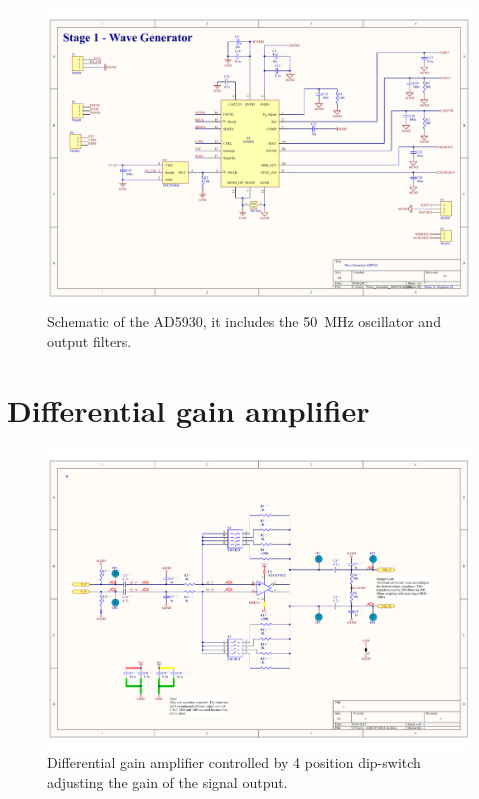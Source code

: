 \begin{landscape}
	\begin{figure}[!htpb]
		\centering
		\includegraphics[width=\paperwidth,keepaspectratio]{DDS}
		\caption[Direct digital synthesis circuit schematic]{Schematic of the AD5930, it includes the \SI{50}{\mega\hertz} oscillator and output filters.}
		\label{fig:DDS}
	\end{figure}
\end{landscape}

\section*{Differential gain amplifier}
\label{Appendix: DGA}
\begin{figure}[!htpb]
	\centering
	\includegraphics[width=0.9\paperwidth,keepaspectratio,angle=90]{DGA}
	\caption[Schematic of the differential gain amplifier circuit]{Differential gain amplifier controlled by 4 position dip-switch adjusting the gain of the signal output.}
	\label{fig:DGA}
\end{figure}

